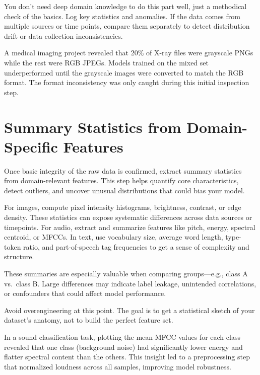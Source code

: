 \documentclass[12pt,openany]{book}
\begin{document}
You don’t need deep domain knowledge to do this part well, just a methodical check of the basics. Log key statistics and anomalies. If the data comes from multiple sources or time points, compare them separately to detect distribution drift or data collection inconsistencies.

\begin{examplebox}
A medical imaging project revealed that 20\% of X-ray files were grayscale PNGs while the rest were RGB JPEGs. Models trained on the mixed set underperformed until the grayscale images were converted to match the RGB format. The format inconsistency was only caught during this initial inspection step.
\end{examplebox}


\section{Summary Statistics from Domain-Specific Features}

Once basic integrity of the raw data is confirmed, extract summary statistics from domain-relevant features. This step helps quantify core characteristics, detect outliers, and uncover unusual distributions that could bias your model.
\newline

For images, compute pixel intensity histograms, brightness, contrast, or edge density. These statistics can expose systematic differences across data sources or timepoints. For audio, extract and summarize features like pitch, energy, spectral centroid, or MFCCs. In text, use vocabulary size, average word length, type-token ratio, and part-of-speech tag frequencies to get a sense of complexity and structure.
\newline

These summaries are especially valuable when comparing groups—e.g., class A vs.\ class B. Large differences may indicate label leakage, unintended correlations, or confounders that could affect model performance.
\newline

Avoid overengineering at this point. The goal is to get a statistical sketch of your dataset’s anatomy, not to build the perfect feature set.

\begin{examplebox}
In a sound classification task, plotting the mean MFCC values for each class revealed that one class (background noise) had significantly lower energy and flatter spectral content than the others. This insight led to a preprocessing step that normalized loudness across all samples, improving model robustness.
\end{examplebox}
\end{document}
